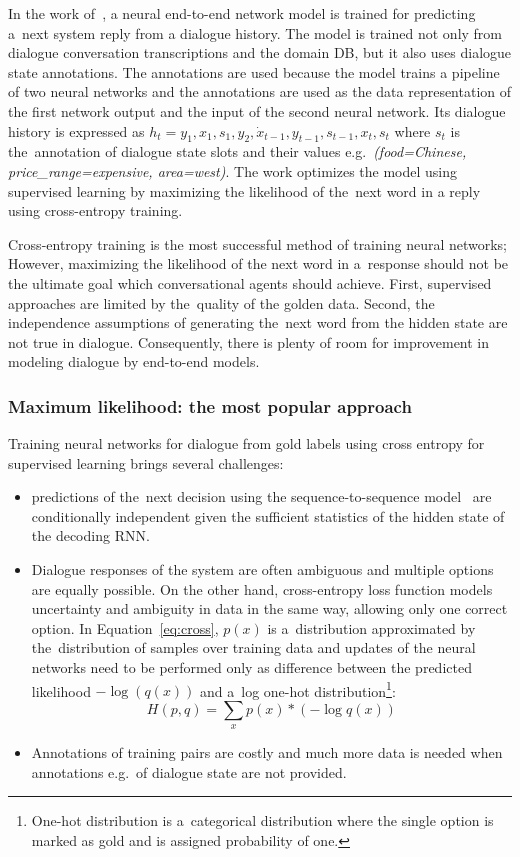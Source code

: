 \documentclass[11pt]{article}
\begin{document}
In the work of~\cite{wen_networkbased_2016}, a neural end-to-end network model is trained for predicting a~next system reply from a dialogue history.
The model is trained not only from dialogue conversation transcriptions and the domain DB, but it also uses dialogue state annotations.
The annotations are used because the model trains a pipeline of two neural networks and the annotations are used as the data representation of the first network output and the input of the second neural network.
Its dialogue history is expressed as $h_t = y_1, x_1, s_1, y_2, \dot x_{t-1}, y_{t-1}, s_{t-1}, x_t, s_t $ where $s_t$ is the~annotation of dialogue state slots and their values e.g.\ {\it (food=Chinese, price\_range=expensive, area=west)}. 
The work optimizes the model using supervised learning by maximizing the likelihood of the~next word in a reply using cross-entropy training.

Cross-entropy training is the most successful method of training neural networks; However, maximizing the likelihood of the next word in a~response should not be the ultimate goal which conversational agents should achieve.
First, supervised approaches are limited by the~quality of the golden data.
Second, the independence assumptions of generating the~next word from the hidden state are not true in dialogue.
Consequently, there is plenty of room for improvement in modeling dialogue by end-to-end models.

\subsubsection*{Maximum likelihood: the most popular approach}\label{sub:maximum_likelihood}
Training neural networks for dialogue from gold labels using cross entropy for supervised learning brings several challenges:
\begin{itemize}
    \item predictions of the~next decision using the sequence-to-sequence model~\cite{bahdanau_neural_2014,sutskever_sequence_2014} are conditionally independent given the sufficient statistics of the hidden state of the decoding RNN.
    \item Dialogue responses of the system are often ambiguous and multiple options are equally possible.
        On the other hand, cross-entropy loss function models uncertainty and ambiguity in data in the same way, allowing only one correct option.
        In Equation~\ref{eq:cross}, $p(x)$ is a~distribution approximated by the~distribution of samples over training data and updates of the neural networks need to be performed only as difference between the predicted likelihood $-\log(q(x))$ and a~log one-hot distribution\footnote{One-hot distribution is a~categorical distribution where the single option is marked as gold and is assigned probability of one.}:
        \begin{equation}\label{eq:cross}
            H(p, q) = \sum_{x}{p(x) * (- \log q(x))}     
        \end{equation}
    \item Annotations of training pairs are costly and much more data is needed when annotations e.g.\ of dialogue state are not provided.
\end{itemize}
\end{document}
